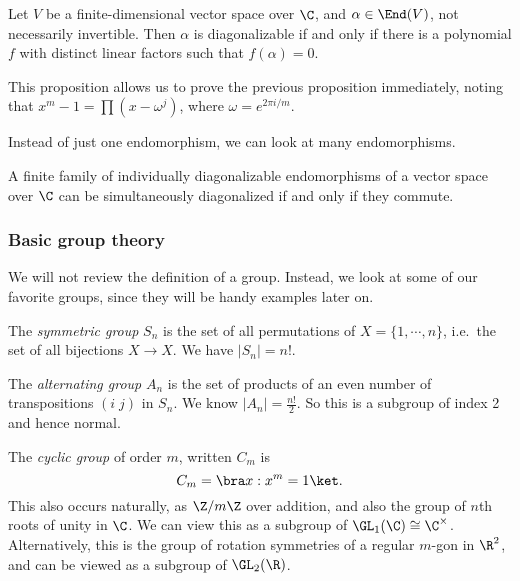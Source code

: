 \documentclass[a4paper]{article}
\begin{document}
\begin{prop}
  Let $V$ be a finite-dimensional vector space over $\C$, and $\alpha \in \End(V)$, not necessarily invertible. Then $\alpha$ is diagonalizable if and only if there is a polynomial $f$ with distinct linear factors such that $f(\alpha) = 0$.
\end{prop}
This proposition allows us to prove the previous proposition immediately, noting that $x^m - 1 = \prod(x - \omega^j)$, where $\omega = e^{2\pi i/m}$.

Instead of just one endomorphism, we can look at many endomorphisms.

\begin{prop}
  A finite family of individually diagonalizable endomorphisms of a vector space over $\C$ can be simultaneously diagonalized if and only if they commute.
\end{prop}

\subsubsection*{Basic group theory}
We will not review the definition of a group. Instead, we look at some of our favorite groups, since they will be handy examples later on.

\begin{defi}
  The \emph{symmetric group} $S_n$ is the set of all permutations of $X = \{1, \cdots, n\}$, i.e.\ the set of all bijections $X \to X$. We have $|S_n| = n!$.
\end{defi}

\begin{defi}
  The \emph{alternating group} $A_n$ is the set of products of an even number of transpositions $(i\; j)$ in $S_n$. We know $|A_n| = \frac{n!}{2}$. So this is a subgroup of index 2 and hence normal.
\end{defi}

\begin{defi}
  The \emph{cyclic group} of order $m$, written $C_m$ is
  \[
    C_m = \bra x: x^m = 1\ket.
  \]
  This also occurs naturally, as $\Z/m\Z$ over addition, and also the group of $n$th roots of unity in $\C$. We can view this as a subgroup of $\GL_1(\C) \cong \C^\times$. Alternatively, this is the group of rotation symmetries of a regular $m$-gon in $\R^2$, and can be viewed as a subgroup of $\GL_2(\R)$.
\end{defi}
\end{document}
